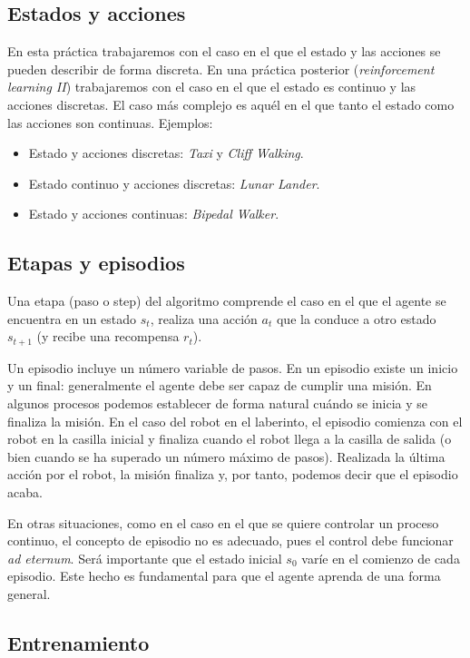 \documentclass{article}
\begin{document}
\subsection{Estados y acciones}
En esta práctica trabajaremos con el caso en el que el estado y las acciones se pueden describir de forma discreta. En una práctica posterior (\textit{reinforcement learning II}) trabajaremos con el caso en el que el estado es continuo y las acciones discretas. El caso más complejo es aquél en el que tanto el estado como las acciones son continuas. Ejemplos:
\begin{itemize}
    \item Estado y acciones discretas: \textit{Taxi} y \textit{Cliff Walking}.
    \item Estado continuo y acciones discretas: \textit{Lunar Lander}.
    \item Estado y acciones continuas: \textit{Bipedal Walker}.
\end{itemize}


\subsection{Etapas y episodios}
Una etapa (paso o step) del algoritmo comprende el caso en el que el agente se encuentra en un estado $s_t$, realiza una acción $a_t$ que la conduce a otro estado $s_{t+1}$ (y recibe una recompensa $r_{t}$).

Un episodio incluye un número variable de pasos. En un episodio existe un inicio y un final: generalmente el agente debe ser capaz de cumplir una misión. En algunos procesos podemos establecer de forma natural cuándo se inicia y se finaliza la misión. En el caso del robot en el laberinto, el episodio comienza con el robot en la casilla inicial y finaliza cuando el robot llega a la casilla de salida (o bien cuando se ha superado un número máximo de pasos). Realizada la última acción por el robot, la misión finaliza y, por tanto, podemos decir que el episodio acaba.

En otras situaciones, como en el caso en el que se quiere controlar un proceso continuo, el concepto de episodio no es adecuado, pues el control debe funcionar \textit{ad eternum}. %
Será importante que el estado inicial $s_0$ varíe en el comienzo de cada episodio. Este hecho es fundamental para que el agente aprenda de una forma general.

\subsection{Entrenamiento}
\end{document}
